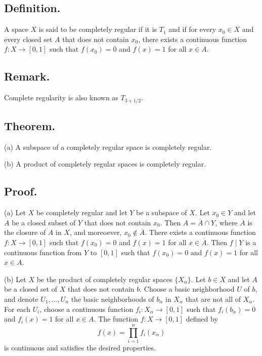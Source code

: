 \documentclass[titlepage]{article}
\begin{document}
\subsection{Definition.} A space $X$ is said to be completely regular if it is $T_{1}$ and if for every $x_{0} \in X$ and every closed set $A$ that does not contain $x_{0}$, there exists a continuous function $f: X \to [0, 1]$ such that $f(x_{0}) = 0$ and $f(x) = 1$ for all $x \in A$.

\subsection{Remark.} Complete regularity is also known as $T_{3+1/2}$.

\subsection{Theorem.}

(a) A subspace of a completely regular space is completely regular.

(b) A product of completely regular spaces is completely regular.

\subsection{Proof.}

(a) Let $X$ be completely regular and let $Y$ be a subspace of $X$. Let $x_{0} \in Y$ and let $A$ be a closed subset of $Y$ that does not contain $x_{0}$. Then $A = \overline{A} \cap Y$, where $\overline{A}$ is the closure of $A$ in $X$, and moreoever, $x_{0} \not\in \overline{A}$. There exists a continuous function $f: X \to [0, 1]$ such that $f(x_{0}) = 0$ and $f(x) = 1$ for all $x \in \overline{A}$. Then $f \mid Y$ is a continuous function from $Y$ to $[0, 1]$ such that $f(x_{0}) = 0$ and $f(x) = 1$ for all $x \in A$.

(b) Let $X$ be the product of completely regular spaces $\{X_{\alpha}\}$. Let $b \in X$ and let $A$ be a closed set of $X$ that does not contain $b$. Choose a basic neighborhood $U$ of $b$, and denote $U_{1}, \ldots, U_{n}$ the basic neighborhoods of $b_{\alpha}$ in $X_{\alpha}$ that are not all of $X_{\alpha}$. For each $U_{i}$, choose a continuous function $f_{i}: X_{\alpha} \to [0, 1]$ such that $f_{i}(b_{\alpha}) = 0$ and $f_{i}(x) = 1$ for all $x \in A$. The function $f: X \to [0, 1]$ defined by 
$$f(x) = \prod_{i=1}^{n} f_{i}(x_{\alpha})$$
is continuous and satisfies the desired properties.
\end{document}
